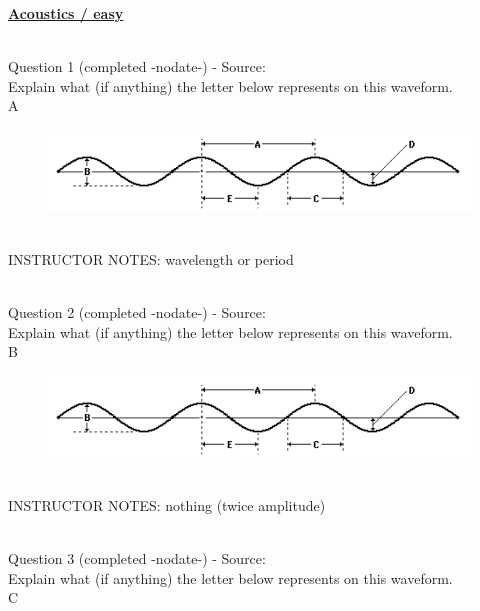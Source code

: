 \documentclass[12pt]{article}
\begin{document}
\newpage\textbf{\underline{\huge Acoustics / easy\\}}

~\\

{\large Question 1} (completed -nodate-) - Source: \\

Explain what (if anything) the letter below represents on this waveform.\\

A

\begin{figure}[H]
\includegraphics{../images/sinusoid.png}
\end{figure}

~\\
INSTRUCTOR NOTES: wavelength or period


~\\

{\large Question 2} (completed -nodate-) - Source: \\

Explain what (if anything) the letter below represents on this waveform.\\

B

\begin{figure}[H]
\includegraphics{../images/sinusoid.png}
\end{figure}

~\\
INSTRUCTOR NOTES: nothing (twice amplitude)


~\\

{\large Question 3} (completed -nodate-) - Source: \\

Explain what (if anything) the letter below represents on this waveform.\\

C
\end{document}
